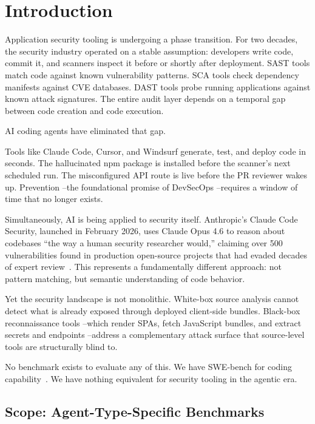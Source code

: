 \documentclass[11pt,twocolumn]{article}
\begin{document}
\section{Introduction}

Application security tooling is undergoing a phase transition. For two decades, the security industry operated on a stable assumption: developers write code, commit it, and scanners inspect it before or shortly after deployment. SAST tools match code against known vulnerability patterns. SCA tools check dependency manifests against CVE databases. DAST tools probe running applications against known attack signatures. The entire audit layer depends on a temporal gap between code creation and code execution.

AI coding agents have eliminated that gap.

Tools like Claude Code, Cursor, and Windsurf generate, test, and deploy code in seconds. The hallucinated npm package is installed before the scanner's next scheduled run. The misconfigured API route is live before the PR reviewer wakes up. Prevention --the foundational promise of DevSecOps --requires a window of time that no longer exists.

Simultaneously, AI is being applied to security itself. Anthropic's Claude Code Security, launched in February 2026, uses Claude Opus 4.6 to reason about codebases ``the way a human security researcher would,'' claiming over 500 vulnerabilities found in production open-source projects that had evaded decades of expert review~\cite{anthropic2026}. This represents a fundamentally different approach: not pattern matching, but semantic understanding of code behavior.

Yet the security landscape is not monolithic. White-box source analysis cannot detect what is already exposed through deployed client-side bundles. Black-box reconnaissance tools --which render SPAs, fetch JavaScript bundles, and extract secrets and endpoints --address a complementary attack surface that source-level tools are structurally blind to.

No benchmark exists to evaluate any of this. We have SWE-bench for coding capability~\cite{swebench2024}. We have nothing equivalent for security tooling in the agentic era.

\subsection{Scope: Agent-Type-Specific Benchmarks}
\end{document}
